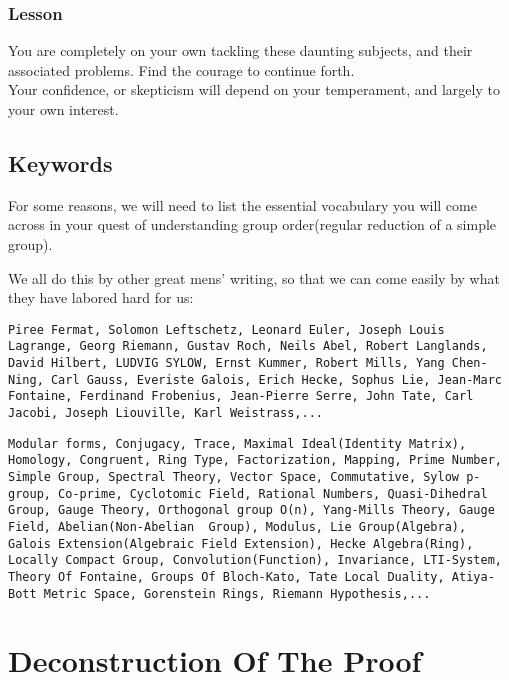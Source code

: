 \documentclass[11pt,fancy]{elegantbook}
\begin{document}
\subsection{Lesson}
You are completely on your own tackling these daunting subjects, and their associated problems. Find the courage to continue forth. \\ 
Your confidence, or skepticism will depend on your temperament, and largely to your own interest.

\section{Keywords}
For some reasons, we will need to list the essential vocabulary you will come across in your quest of understanding group order(regular reduction of a simple group). \\
\begin{remark}
We all do this by other great mens' writing, so that we can come easily by what they have labored hard for us:
\begin{lstlisting}
Piree Fermat, Solomon Leftschetz, Leonard Euler, Joseph Louis Lagrange, Georg Riemann, Gustav Roch, Neils Abel, Robert Langlands, David Hilbert, LUDVIG SYLOW, Ernst Kummer, Robert Mills, Yang Chen-Ning, Carl Gauss, Everiste Galois, Erich Hecke, Sophus Lie, Jean-Marc Fontaine, Ferdinand Frobenius, Jean-Pierre Serre, John Tate, Carl Jacobi, Joseph Liouville, Karl Weistrass,...
\end{lstlisting}
\begin{lstlisting}
Modular forms, Conjugacy, Trace, Maximal Ideal(Identity Matrix), Homology, Congruent, Ring Type, Factorization, Mapping, Prime Number, Simple Group, Spectral Theory, Vector Space, Commutative, Sylow p-group, Co-prime, Cyclotomic Field, Rational Numbers, Quasi-Dihedral Group, Gauge Theory, Orthogonal group O(n), Yang-Mills Theory, Gauge Field, Abelian(Non-Abelian  Group), Modulus, Lie Group(Algebra), Galois Extension(Algebraic Field Extension), Hecke Algebra(Ring), Locally Compact Group, Convolution(Function), Invariance, LTI-System, Theory Of Fontaine, Groups Of Bloch-Kato, Tate Local Duality, Atiya-Bott Metric Space, Gorenstein Rings, Riemann Hypothesis,...
\end{lstlisting}   
\end{remark}


\chapter{Deconstruction Of The Proof}
\end{document}
